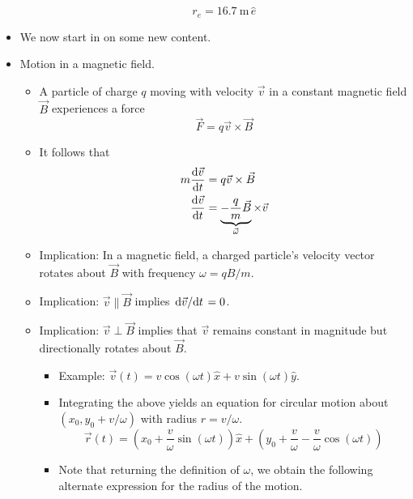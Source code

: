 \documentclass[../notes.tex]{subfiles}
\begin{document}
\begin{itemize}
\begin{itemize}
        \begin{equation*}
            r_e = \SI{16.7}{\meter}\,\hat{e}
        \end{equation*}
    \end{itemize}
    \item We now start in on some new content.
    \item Motion in a magnetic field.
    \begin{itemize}
        \item A particle of charge $q$ moving with velocity $\vec{v}$ in a constant magnetic field $\vec{B}$ experiences a force
        \begin{equation*}
            \vec{F} = q\vec{v}\times\vec{B}
        \end{equation*}
        \item It follows that
        \begin{align*}
            m\dv{\vec{v}}{t} &= q\vec{v}\times\vec{B}\\
            \dv{\vec{v}}{t} &= \underbrace{-\frac{q}{m}\vec{B}}_{\vec{\omega}}\times\vec{v}\\
        \end{align*}
        \item Implication: In a magnetic field, a charged particle's velocity vector rotates about $\vec{B}$ with frequency $\omega=qB/m$.
        \item Implication: $\vec{v}\parallel\vec{B}$ implies $\dv*{\vec{v}}{t}=0$.
        \item Implication: $\vec{v}\perp\vec{B}$ implies that $\vec{v}$ remains constant in magnitude but directionally rotates about $\vec{B}$.
        \begin{itemize}
            \item Example: $\vec{v}(t)=v\cos(\omega t)\hat{x}+v\sin(\omega t)\hat{y}$.
            \item Integrating the above yields an equation for circular motion about $(x_0,y_0+v/\omega)$ with radius $r=v/\omega$.
            \begin{equation*}
                \vec{r}(t) = \left( x_0+\frac{v}{\omega}\sin(\omega t) \right)\hat{x}+\left( y_0+\frac{v}{\omega}-\frac{v}{\omega}\cos(\omega t) \right)
            \end{equation*}
            \item Note that returning the definition of $\omega$, we obtain the following alternate expression for the radius of the motion.
            \begin{equation*}

\end{equation*}
\end{itemize}
\end{itemize}
\end{itemize}
\end{document}
